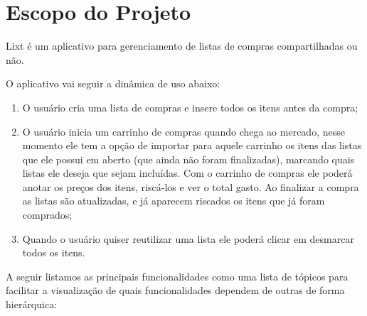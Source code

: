 \section{Escopo do Projeto}

Lixt é um aplicativo para gerenciamento de listas de compras compartilhadas ou não.

O aplicativo vai seguir a dinâmica de uso abaixo:
\begin{enumerate}
	\item O usuário cria uma lista de compras e insere todos os itens antes da compra;
	\item O usuário inicia um carrinho de compras quando chega ao mercado, nesse momento ele tem a opção de importar para aquele carrinho os itens das listas que ele possui em aberto (que ainda não foram finalizadas), marcando quais listas ele deseja que sejam incluídas. Com o carrinho de compras ele poderá anotar os preços dos itens, riscá-los e ver o total gasto. Ao finalizar a compra as listas são atualizadas, e já aparecem riscados os itens que já foram comprados;
	\item Quando o usuário quiser reutilizar uma lista ele poderá clicar em desmarcar todos os itens.
\end{enumerate}

A seguir listamos as principais funcionalidades como uma lista de tópicos para facilitar a visualização de quais funcionalidades dependem de outras de forma hierárquica:

